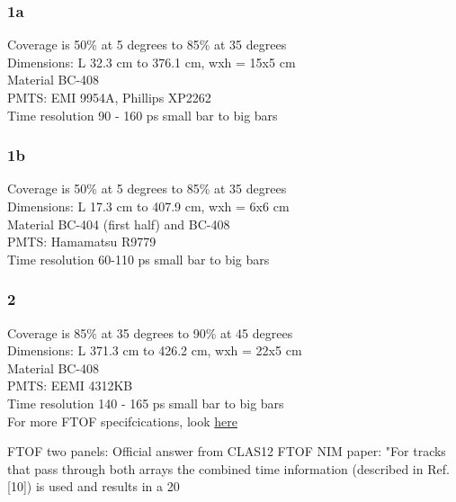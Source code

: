             \subsubsection{1a}
                Coverage is 50\% at 5 degrees to 85\% at 35 degrees\\
                Dimensions: L 32.3 cm to 376.1 cm, wxh = 15x5 cm\\
                Material BC-408\\
                PMTS: EMI 9954A, Phillips XP2262\\
                Time resolution 90 - 160 ps small bar to big bars\\
            \subsubsection{1b}
                Coverage is 50\% at 5 degrees to 85\% at 35 degrees\\
                Dimensions: L 17.3 cm to 407.9 cm, wxh = 6x6 cm\\
                Material BC-404 (first half) and BC-408\\
                PMTS: Hamamatsu R9779\\
                Time resolution 60-110 ps small bar to big bars\\
            \subsubsection{2}
                Coverage is 85\% at 35 degrees to 90\% at 45 degrees\\
                Dimensions: L 371.3 cm to 426.2 cm, wxh = 22x5 cm\\
                Material BC-408\\
                PMTS: EEMI 4312KB\\
                Time resolution 140 - 165 ps small bar to big bars\\
           
           
            For more FTOF specifcications, look \href{https://www.jlab.org/Hall-B/ftof/notes/ftof_geom.pdf}{here} 
                
            FTOF two panels:
Official answer from CLAS12 FTOF NIM paper:
"For tracks that pass through both arrays the combined time information (described in Ref. [10]) is used and results in a 20%

